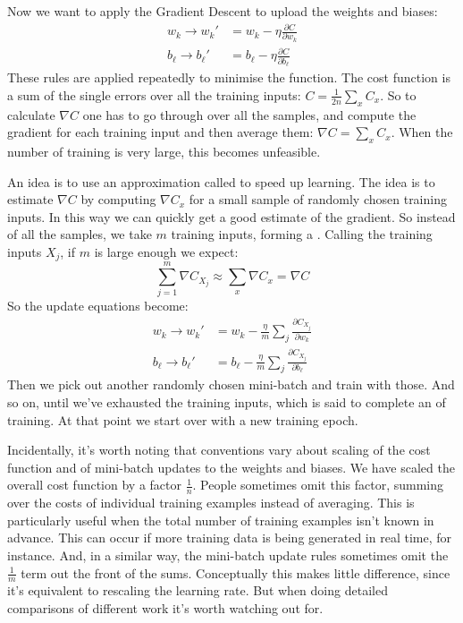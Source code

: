 Now we want to apply the Gradient Descent to upload the weights and biases:
\begin{equation}
\begin{aligned}
w_k \rightarrow w_k' &= w_k - \eta \frac{\partial C}{\partial w_k}\\
b_\ell \rightarrow b_\ell' &= b_\ell - \eta \frac{\partial C}{\partial b_\ell}
\end{aligned}
\end{equation}
These rules are applied repeatedly to minimise the function. The cost function is a sum of the single errors over all the training inputs: $C = \frac{1}{2n}\sum_x C_x$. So to calculate $\nabla C$ one has to go through over all the samples, and compute the gradient for each training input and then average them: $\nabla C = \sum_x C_x$. When the number of training is very large, this becomes unfeasible. 

An idea is to use an approximation called  to speed up learning. The idea is to estimate $\nabla C$ by computing $\nabla C_x$ for a small sample of randomly chosen training inputs. In this way we can quickly get a good estimate of the gradient. So instead of all the samples, we take $m$ training inputs, forming a . Calling the training inputs $X_j$, if $m$ is large enough we expect:
\begin{equation}
\sum_{j=1}^{m} \nabla C_{X_j}\approx \sum_{x}\nabla C_x =\nabla C
\end{equation}
So the update equations become:
\begin{equation}
\begin{aligned}
w_k \rightarrow w_k' &= w_k - \frac{\eta}{m} \sum_j  \frac{\partial C_{X_j}}{\partial w_k}\\
b_\ell \rightarrow b_\ell' &= b_\ell - \frac{\eta}{m} \sum_j  \frac{\partial C_{X_j}}{\partial b_\ell}
\end{aligned}
\end{equation}
Then we pick out another randomly chosen mini-batch and train with those. And so on, until we've exhausted the training inputs, which is said to complete an  of training. At that point we start over with a new training epoch.

Incidentally, it's worth noting that conventions vary about scaling of the cost function and of mini-batch updates to the weights and biases. We have scaled the overall cost function by a factor $\frac{1}{n}$. People sometimes omit this factor, summing over the costs of individual training examples instead of averaging. This is particularly useful when the total number of training examples isn't known in advance. This can occur if more training data is being generated in real time, for instance. And, in a similar way, the mini-batch update rules sometimes omit the $\frac{1}{m}$ term out the front of the sums. Conceptually this makes little difference, since it's equivalent to rescaling the learning rate. But when doing detailed comparisons of different work it's worth watching out for.

